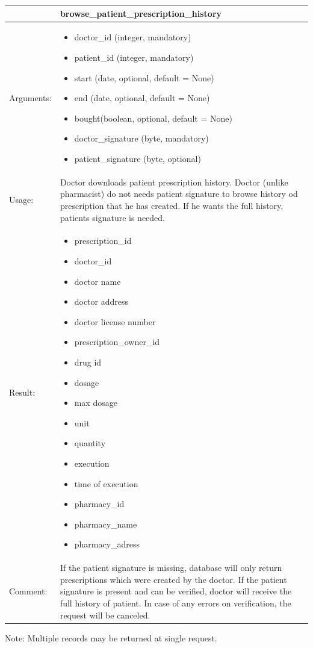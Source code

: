     \begin{longtable}{| p{6cm} | p{7.75cm} |}
    \hline
     & browse\_patient\_prescription\_history \\ \hline
    Arguments: &  \begin{itemize}
    	\item doctor\_id (integer, mandatory)
		\item patient\_id (integer, mandatory)
		\item start (date, optional, default = None)
		\item end (date, optional, default = None)
		\item bought(boolean, optional, default = None)
		\item doctor\_signature (byte, mandatory)
		\item patient\_signature (byte, optional)

	\end{itemize}     \\ \hline
    Usage: & Doctor downloads patient prescription history. Doctor (unlike pharmacist) do not needs patient signature to browse history od prescription that he has created. If he wants the full history, patients signature is needed. \\ \hline
    Result: & \begin{itemize}
    	\item prescription\_id
    	\item doctor\_id
    	\item doctor name
    	\item doctor address
    	\item doctor license number
    	\item prescription\_owner\_id
    	\item drug id
    	\item dosage
    	\item max dosage
    	\item unit
    	\item quantity
    	\item execution
    	\item time of execution
    	\item pharmacy\_id
    	\item pharmacy\_name
    	\item pharmacy\_adress
	\end{itemize}     \\ \hline
	Comment: & If the patient signature is missing, database will only return prescriptions which were created by the doctor. If the patient signature is present and can be verified, doctor will receive the full history of patient. In case of any errors on verification, the request will be canceled. \\ \hline
    \end{longtable}
Note: Multiple records may be returned at single request.

